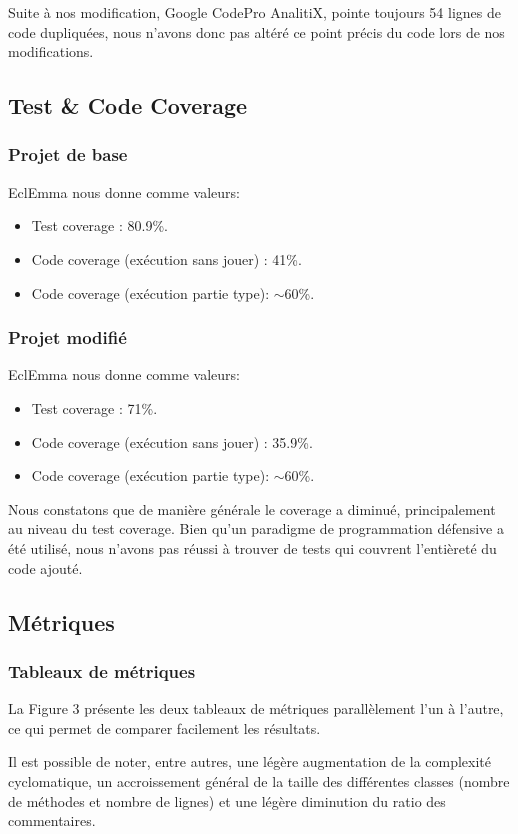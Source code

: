 \documentclass[a4paper,12pt]{report} %
\begin{document}
Suite à nos modification, Google CodePro AnalitiX, pointe toujours 54 lignes de code dupliquées,
nous n'avons donc pas altéré ce point précis du code lors de nos modifications.


\subsection{Test \& Code Coverage}
\subsubsection{Projet de base}
EclEmma nous donne comme valeurs:
\begin{itemize}
\item Test coverage : 80.9\%.
\item Code coverage (exécution sans jouer) : 41\%.
\item Code coverage (exécution partie type): $\sim$60\%.
\end{itemize}

\subsubsection{Projet modifié}
EclEmma nous donne comme valeurs:
\begin{itemize}
\item Test coverage : 71\%.
\item Code coverage (exécution sans jouer) : 35.9\%.
\item Code coverage (exécution partie type): $\sim$60\%.
\end{itemize}
Nous constatons que de manière générale le coverage a diminué, principalement
au niveau du test coverage. Bien qu'un paradigme de programmation
défensive a été utilisé, nous n'avons pas réussi à trouver de tests
qui couvrent l'entièreté du code ajouté.

\subsection{Métriques}
\subsubsection{Tableaux de métriques}
La Figure 3 présente les deux tableaux de métriques parallèlement l'un à l'autre, ce
qui permet de comparer facilement les résultats.

Il est possible de noter, entre autres, une légère augmentation de la complexité
cyclomatique, un accroissement général de la taille des différentes
classes (nombre de méthodes et nombre de lignes) et une légère diminution
du ratio des commentaires.
\end{document}
